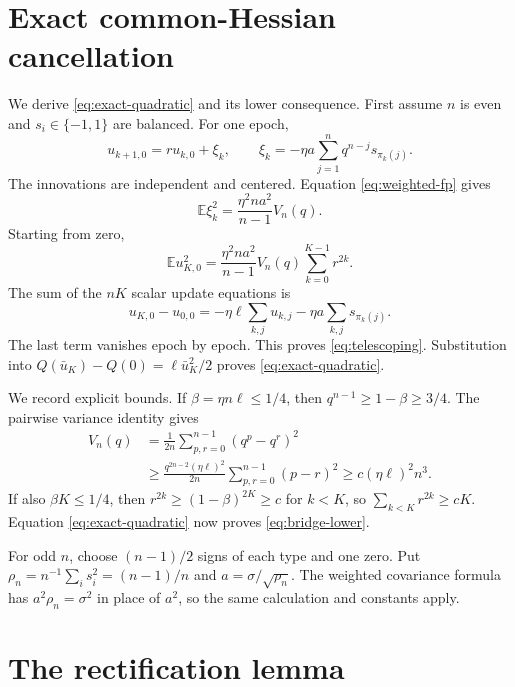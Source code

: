 \documentclass{article}
\theoremstyle{remark}
\newcommand{\E}{\mathbb E}
\newcommand{\1}{\mathbf 1}
\begin{document}
\section{Exact common-Hessian cancellation}\label{app:quadratic}

We derive \eqref{eq:exact-quadratic} and its lower consequence. First assume $n$ is even and $s_i\in\{-1,1\}$ are balanced. For one epoch, \[ u_{k+1,0}=r u_{k,0}+\xi_k, \qquad \xi_k=-\eta a\sum_{j=1}^nq^{n-j}s_{\pi_k(j)}. \] The innovations are independent and centered. Equation \eqref{eq:weighted-fp} gives \[ \E\xi_k^2=\frac{\eta^2na^2}{n-1}V_n(q). \] Starting from zero, \[ \E u_{K,0}^2 =\frac{\eta^2na^2}{n-1}V_n(q) \sum_{k=0}^{K-1}r^{2k}. \] The sum of the $nK$ scalar update equations is \[ u_{K,0}-u_{0,0} =-\eta\ell\sum_{k,j}u_{k,j} -\eta a\sum_{k,j}s_{\pi_k(j)}. \] The last term vanishes epoch by epoch. This proves \eqref{eq:telescoping}. Substitution into $Q(\bar u_K)-Q(0)=\ell\bar u_K^2/2$ proves \eqref{eq:exact-quadratic}.

We record explicit bounds. If $\beta=\eta n\ell\leq1/4$, then $q^{n-1}\geq1-\beta\geq3/4$. The pairwise variance identity gives
\begin{align*}
 V_n(q)
 &=\frac1{2n}\sum_{p,r=0}^{n-1}(q^p-q^r)^2\\
 &\geq\frac{q^{2n-2}(\eta\ell)^2}{2n}
        \sum_{p,r=0}^{n-1}(p-r)^2
 \geq c(\eta\ell)^2n^3.                              \label{eq:V-lower}
\end{align*}
If also $\beta K\leq1/4$, then $r^{2k}\geq(1-\beta)^{2K}\geq c$ for $k<K$, so $\sum_{k<K}r^{2k}\geq cK$. Equation \eqref{eq:exact-quadratic} now proves \eqref{eq:bridge-lower}.

For odd $n$, choose $(n-1)/2$ signs of each type and one zero. Put $\rho_n=n^{-1}\sum_i s_i^2=(n-1)/n$ and $a=\sigma/\sqrt{\rho_n}$. The weighted covariance formula has $a^2\rho_n=\sigma^2$ in place of $a^2$, so the same calculation and constants apply.

\section{The rectification lemma}\label{app:rectifier}
\end{document}
